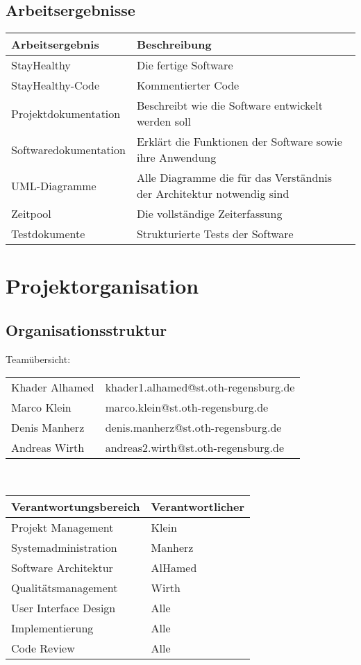 \documentclass[12pt,a4paper,onecolumn]{article}
\begin{document}
\subsection{Arbeitsergebnisse}
\begin{tabularx}{\textwidth}{ |l|X| } 
 \hline
\textbf{Arbeitsergebnis}  & \textbf{Beschreibung}\\ 
 \hline
 StayHealthy & Die fertige Software\\ 
 \hline
 StayHealthy-Code & Kommentierter Code\\
 \hline
 Projektdokumentation & Beschreibt wie die Software entwickelt werden soll\\
 \hline
 Softwaredokumentation & Erklärt die Funktionen der Software sowie ihre Anwendung\\
 \hline
 UML-Diagramme & Alle Diagramme die für das Verständnis der Architektur notwendig sind \\ 
 \hline
 Zeitpool & Die vollständige Zeiterfassung\\
 \hline
 Testdokumente & Strukturierte Tests der Software\\
 \hline
\end{tabularx}

\section{Projektorganisation}

\subsection{Organisationsstruktur}
Teamübersicht:
\vspace{0.2cm}\\
\begin{tabularx}{\textwidth}{l X}
Khader Alhamed & khader1.alhamed@st.oth-regensburg.de\\
Marco Klein & marco.klein@st.oth-regensburg.de\\
Denis Manherz & denis.manherz@st.oth-regensburg.de\\
Andreas Wirth & andreas2.wirth@st.oth-regensburg.de\\
\end{tabularx}
\vspace{0.2cm}\\
\begin{tabular}{|l|l|}
\hline
     \textbf{Verantwortungsbereich} & \textbf{Verantwortlicher}\\
     \hline
     Projekt Management & Klein\\
     \hline
     Systemadministration &  Manherz\\
     \hline 
     Software Architektur & AlHamed \\
     \hline
     Qualitätsmanagement & Wirth\\
     \hline
     User Interface Design & Alle\\
     \hline
     Implementierung & Alle\\
     \hline
     Code Review & Alle\\
     \hline
\end{tabular}
\end{document}
